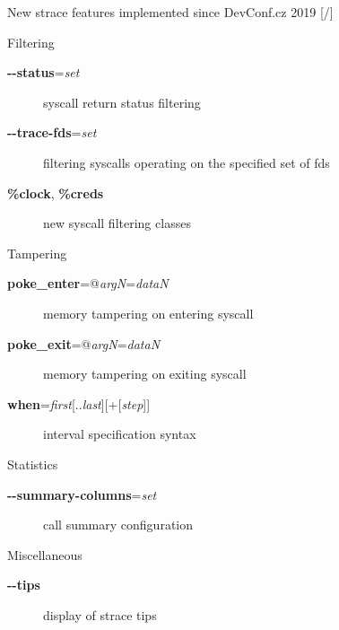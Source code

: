 \documentclass[unicode,aspectratio=169,xcolor={table,dvipsnames,usernames}]{beamer}
\begin{document}
\begin{frame}{New strace features implemented since DevConf.cz 2019 \hfill [\insertframenumber/\inserttotalframenumber]}
\begin{block}{Filtering}
\begin{description}
	\item[\textbf{-{}-status}=\textit{set}\hfill] syscall return status filtering
	\item[\textbf{-{}-trace-fds}=\textit{set}] filtering syscalls operating on the specified set of fds
	\item[\textbf{\%clock}, \textbf{\%creds}] new syscall filtering classes
\end{description}
\end{block}

\begin{block}{Tampering}
\begin{description}
	\item[\textbf{poke\_enter}=@\textit{argN}=\textit{dataN}] memory tampering on entering syscall
	\item[\textbf{poke\_exit}=@\textit{argN}=\textit{dataN}] memory tampering on exiting syscall
	\item[\textbf{when}=\textit{first}[..\textit{last}{]}[+[\textit{step}{]}{]}] interval specification syntax
\end{description}
\end{block}

\begin{block}{Statistics}
\begin{description}
	\item[\textbf{-{}-summary-columns}=\textit{set}] call summary configuration
\end{description}
\end{block}

\begin{block}{Miscellaneous}
\begin{description}
	\item[\textbf{-{}-tips}\hfill] display of strace tips
\end{description}
\end{block}
\end{frame}
\end{document}
